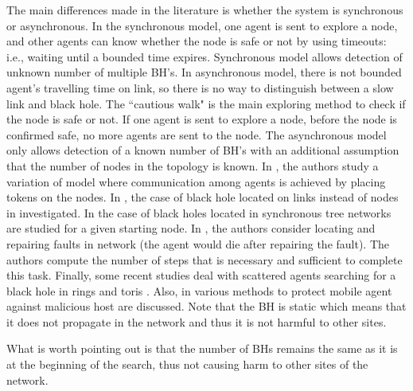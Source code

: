 The main differences made in the literature is  whether the system is synchronous or asynchronous. In the synchronous model, one agent is sent to explore a node, and other agents can know whether the node is safe or not by using timeouts: i.e., waiting until a bounded time  expires. Synchronous model allows detection of unknown number of multiple BH's. In asynchronous model, there is not bounded agent's travelling time on link, so there is no way to distinguish between a slow link and black hole. The ``cautious walk" is the main exploring method to check if the node is safe or not. If one agent is sent to explore   a node, before the node is confirmed safe, no more agents are sent to the node. The asynchronous model only allows detection of a known number of BH's with an additional assumption that the number of nodes in the topology is known. In \cite{dobr,dobr1,shi}, the authors study a variation of model where communication among agents is achieved by placing tokens on the nodes. In \cite{chal2}, the case of black hole located on links instead of nodes in investigated.
%
 In \cite{Czyz2} the case of black holes located in   synchronous tree networks are studied for a given starting node.
 In \cite{cc}, the authors consider locating  and repairing faults in network (the agent would die after repairing the fault). The authors compute   the number of steps that is necessary and sufficient to complete this task. Finally, some recent studies deal with scattered agents searching for a black hole in rings and toris \cite{das2,chal2}. Also, in \cite{sand,hohl1,hohl2,rubi}   various methods to protect mobile agent against malicious host are discussed. Note that the BH is static which means that it does not propagate in the network and thus it is not harmful to other sites. 


What is worth pointing out is that the number of BHs remains the same as it is at the beginning of the search,   thus not causing harm to other sites of the network.
 
